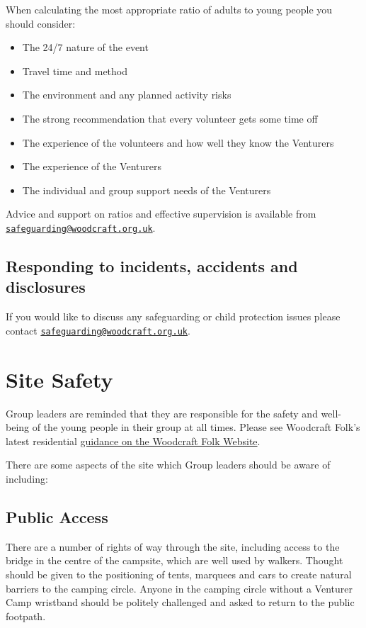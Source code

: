 \documentclass[a4paper, 11pt]{report}
\newcommand{\nl}{\newline}
\begin{document}
When calculating the most appropriate ratio of adults to young people you should consider:
\begin{itemize}
    \item The 24/7 nature of the event
    \item Travel time and method
    \item The environment and any planned activity risks
    \item The strong recommendation that every volunteer gets some time off
    \item The experience of the volunteers and how well they know the Venturers
    \item The experience of the Venturers
    \item The individual and group support needs of the Venturers
\end{itemize}
Advice and support on ratios and effective supervision is available from \href{mailto:safeguarding@woodcraft.org.uk}{\texttt{safeguarding@woodcraft.org.uk}}.

\section{Responding to incidents, accidents and disclosures}
If you would like to discuss any safeguarding or child protection issues please contact \href{mailto:safeguarding@woodcraft.org.uk}{\texttt{safeguarding@woodcraft.org.uk}}.

\chapter{Site Safety}
Group leaders are reminded that they are responsible for the safety and well-being of the young people in their group at all times. Please see Woodcraft Folk's latest residential \href{https://woodcraft.org.uk/group-guidance/camping-and-residentials/}{guidance on the Woodcraft Folk Website}. \nl

There are some aspects of the site which Group leaders should be aware of including:
\section{Public Access}
There are a number of rights of way through the site, including access to the bridge in the centre of the campsite, which are well used by walkers. Thought should be given to the positioning of tents, marquees and cars to create natural barriers to the camping circle. Anyone in the camping circle without a Venturer Camp wristband should be politely challenged and asked to return to the public footpath.
\end{document}
